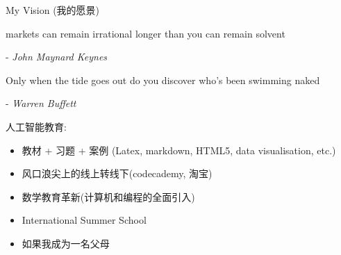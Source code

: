 \documentclass[handout]{beamer}
\begin{document}
\begin{frame}{My Vision (我的愿景)}

markets can remain irrational longer than you can remain solvent

\hfill - \textit{John Maynard Keynes}

Only when the tide goes out do you discover who's been swimming naked

\hfill - \textit{Warren Buffett }

人工智能教育:
\hfil

\begin{itemize}
\setlength\itemsep{1em}
	\item 教材 + 习题 + 案例 (Latex, markdown, HTML5, data visualisation, etc.) 
	\item 风口浪尖上的线上转线下(codecademy, 淘宝)
	\item 数学教育革新(计算机和编程的全面引入)
	\item International Summer School 
	\item 如果我成为一名父母
\end{itemize}
\end{frame}
\end{document}
